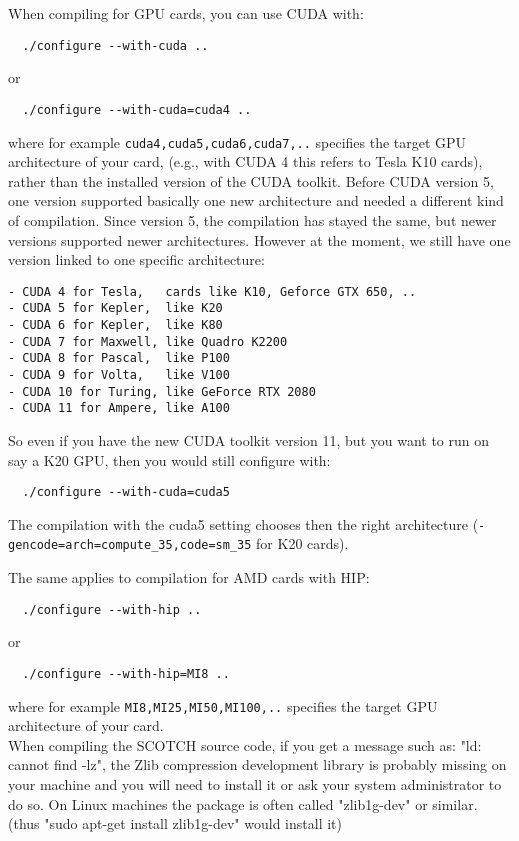 \noindent
When compiling for GPU cards, you can use CUDA with:
\begin{verbatim}
  ./configure --with-cuda ..
\end{verbatim}
or
\begin{verbatim}
  ./configure --with-cuda=cuda4 ..
\end{verbatim}
where for example \texttt{cuda4,cuda5,cuda6,cuda7,..} specifies the target GPU architecture of your card,
(e.g., with CUDA 4 this refers to Tesla K10 cards), rather than the installed version of the CUDA toolkit.
Before CUDA version 5, one version supported basically one new architecture and needed a different kind of compilation.
Since version 5, the compilation has stayed the same, but newer versions supported newer architectures.
However at the moment, we still have one version linked to one specific architecture:
\begin{verbatim}
- CUDA 4 for Tesla,   cards like K10, Geforce GTX 650, ..
- CUDA 5 for Kepler,  like K20
- CUDA 6 for Kepler,  like K80
- CUDA 7 for Maxwell, like Quadro K2200
- CUDA 8 for Pascal,  like P100
- CUDA 9 for Volta,   like V100
- CUDA 10 for Turing, like GeForce RTX 2080
- CUDA 11 for Ampere, like A100
\end{verbatim}
So even if you have the new CUDA toolkit version 11, but you want to run on say a K20 GPU, then you would still configure with:
\begin{verbatim}
  ./configure --with-cuda=cuda5
\end{verbatim}
The compilation with the cuda5 setting chooses then the right architecture (\texttt{-gencode=arch=compute\_35,code=sm\_35} for K20 cards).

The same applies to compilation for AMD cards with HIP:
\begin{verbatim}
  ./configure --with-hip ..
\end{verbatim}
or
\begin{verbatim}
  ./configure --with-hip=MI8 ..
\end{verbatim}
where for example \texttt{MI8,MI25,MI50,MI100,..} specifies the target GPU architecture of your card.\\



When compiling the SCOTCH source code, if you get a message such as: "ld: cannot find -lz",
the Zlib compression development library is probably missing on your machine and you will need to install it or ask your system administrator to
do so. On Linux machines the package is often called "zlib1g-dev" or similar. (thus "sudo apt-get install zlib1g-dev" would install it)\\

